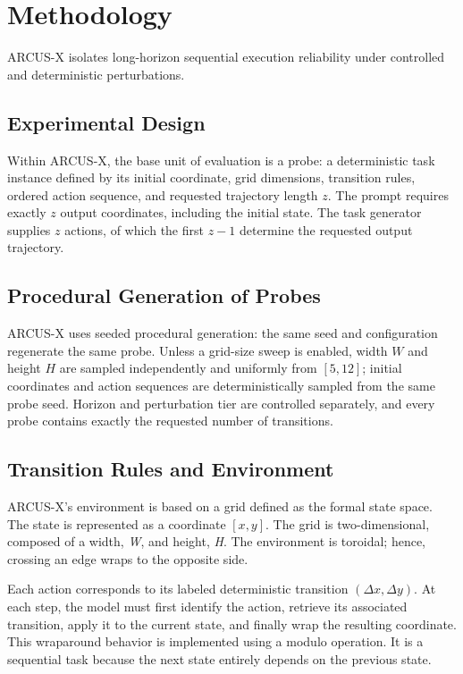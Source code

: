 \documentclass{article}
\begin{document}
\section{Methodology}

\label{Methodology}

ARCUS-X isolates long-horizon sequential execution reliability under controlled and deterministic perturbations.

\subsection{Experimental Design}

Within ARCUS-X, the base unit of evaluation is a probe:
a deterministic task instance defined by its initial
coordinate, grid dimensions, transition rules, ordered
action sequence, and requested trajectory length $z$.
The prompt requires exactly $z$ output coordinates,
including the initial state. The task generator supplies
$z$ actions, of which the first $z-1$ determine the
requested output trajectory.
\subsection{Procedural Generation of Probes}

ARCUS-X uses seeded procedural generation: the same seed and configuration regenerate the same probe. Unless a grid-size sweep is enabled, width $W$ and height $H$ are sampled independently and uniformly from $[5,12]$; initial coordinates and action sequences are deterministically sampled from the same probe seed. Horizon and perturbation tier are controlled separately, and every probe contains exactly the requested number of transitions.

\subsection{Transition Rules and Environment}

ARCUS-X's environment is based on a grid defined as the formal state space. The state is represented as a coordinate $[x,y]$. The grid is two-dimensional, composed of a width, \textit{W}, and height, \textit{H}. The environment is toroidal; hence, crossing an edge wraps to the opposite side.

Each action corresponds to its labeled deterministic transition $(\Delta x, \Delta y)$. At each step, the model must first identify the action, retrieve its associated transition, apply it to the current state, and finally wrap the resulting coordinate. This wraparound behavior is implemented using a modulo operation. It is a sequential task because the next state entirely depends on the previous state.
\end{document}
